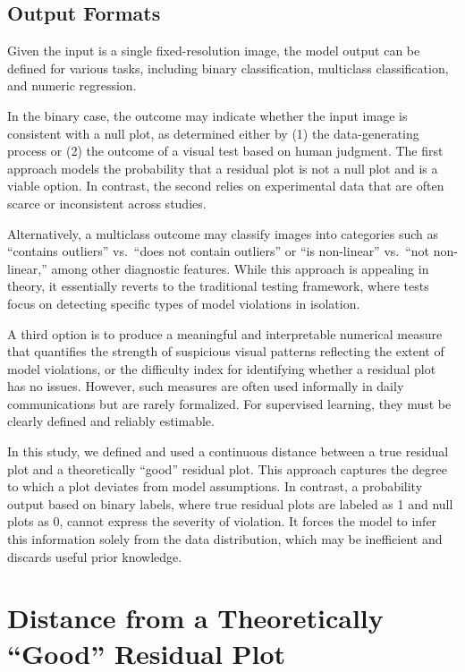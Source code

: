 \documentclass[]{interact}
\theoremstyle{plain}%
\theoremstyle{definition}
\theoremstyle{remark}
\begin{document}
\subsection{Output Formats}\label{output-formats}

Given the input is a single fixed-resolution image, the model output can
be defined for various tasks, including binary classification,
multiclass classification, and numeric regression.

In the binary case, the outcome may indicate whether the input image is
consistent with a null plot, as determined either by (1) the
data-generating process or (2) the outcome of a visual test based on
human judgment. The first approach models the probability that a
residual plot is not a null plot and is a viable option. In contrast,
the second relies on experimental data that are often scarce or
inconsistent across studies.

Alternatively, a multiclass outcome may classify images into categories
such as ``contains outliers'' vs.~``does not contain outliers'' or ``is
non-linear'' vs.~``not non-linear,'' among other diagnostic features.
While this approach is appealing in theory, it essentially reverts to
the traditional testing framework, where tests focus on detecting
specific types of model violations in isolation.

A third option is to produce a meaningful and interpretable numerical
measure that quantifies the strength of suspicious visual patterns
reflecting the extent of model violations, or the difficulty index for
identifying whether a residual plot has no issues. However, such
measures are often used informally in daily communications but are
rarely formalized. For supervised learning, they must be clearly defined
and reliably estimable.

In this study, we defined and used a continuous distance between a true
residual plot and a theoretically ``good'' residual plot. This approach
captures the degree to which a plot deviates from model assumptions. In
contrast, a probability output based on binary labels, where true
residual plots are labeled as 1 and null plots as 0, cannot express the
severity of violation. It forces the model to infer this information
solely from the data distribution, which may be inefficient and discards
useful prior knowledge.

\section{Distance from a Theoretically ``Good'' Residual
Plot}\label{sec-model-distance-between-residual-plots}
\end{document}
